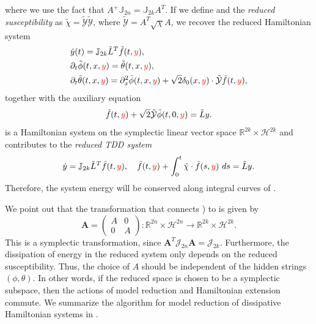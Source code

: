 where we use the fact that $A^+\mathbb J_{2n} = \mathbb{J}_{2k} A^T$. If we define
\edit{
\[
	\tilde f = A^+  f,\quad \tilde \phi = A^+ \phi,\quad \tilde \theta = A^+ \theta, \quad \tilde L = A^T L A,
\]
}
and the \emph{reduced susceptibility} as $\tilde \chi = \tilde {\mathcal Y} \tilde {\mathcal Y}$, where $\tilde {\mathcal Y} = A^T \sqrt{\chi} A$, we recover the reduced Hamiltonian system
\begin{subequations}
\begin{align}
		\label{p3.eq:3.12.a} & \dot{y}(t) = \mathbb J_{2k} {\tilde L}^T \tilde f(t,{\color{red} y}), \\
		\label{p3.eq:3.12.b} & \partial_t \tilde \phi(t,x,{\color{red} y}) = \tilde \theta(t,x,{\color{red} y}),\\
		\label{p3.eq:3.12.c} & \partial_t \tilde \theta(t,x,{\color{red} y}) = \partial_x^2 \tilde \phi(t,x,{\color{red} y}) + \sqrt 2 \delta_0(x,{\color{red} y}) \cdot \tilde {\mathcal Y}  \tilde f(t,{\color{red} y}),
\end{align}
\end{subequations}
together with the auxiliary equation
\begin{equation} \label{p3.eq:3.13}
	\tilde f(t,{\color{red} y}) + \sqrt{2} \tilde {\mathcal Y} \tilde \phi(t,0,{\color{red} y}) = \tilde L y.
\end{equation}
 is a Hamiltonian system on the symplectic linear vector space $\mathbb R^{2k} \times \mathcal H^{2k}$ and contributes to the \emph{reduced TDD system}
\begin{equation} \label{p3.eq:3.14}
	\dot {y} = \mathbb J_{2k} \tilde L^T \tilde f(t,\edit{y}), \quad \tilde f(t,\edit{y}) + \int_0^t \tilde \chi\cdot \tilde f(s,\edit{y})\ ds = \tilde L y.
\end{equation}
Therefore, the system energy will be conserved along integral curves of .

We point out that the transformation that connects ) to  is given by
\begin{equation}
	\mathbf A = \begin{pmatrix}
		A& 0 \\
		0& A
	\end{pmatrix} : \mathbb R^{2n} \times \mathcal H^{2n} \to \mathbb R^{2k} \times \mathcal H^{2k}.
\end{equation}
This is a symplectic transformation, since $\mathbf A^T \mathcal J_{2n} \mathbf A = \mathcal J_{2k}$. Furthermore, the dissipation of energy in the reduced system only depends on the reduced susceptibility. Thus, the choice of $A$ should be independent of the hidden strings $(\phi, \theta)$. In other words, if the reduced space is chosen to be a symplectic subspace, then the actions of model reduction and Hamiltonian extension commute. We summarize the algorithm for model reduction of dissipative Hamiltonian systems in .

